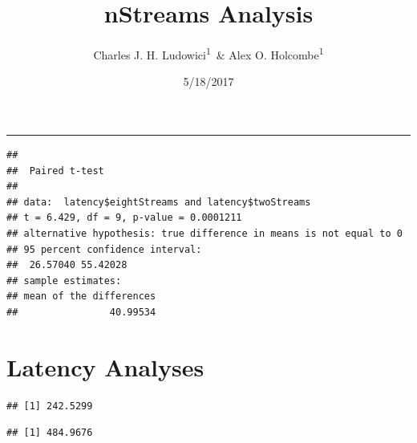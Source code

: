 \documentclass[,man]{apa6}
\title{nStreams Analysis}
\author{Charles J. H. Ludowici\textsuperscript{1}~\& Alex O.
Holcombe\textsuperscript{1}}
\date{5/18/2017}
\affiliation{
\vspace{0.5cm}
\textsuperscript{1} The University of Sydney}
\begin{document}
\maketitle

\begin{center}\rule{0.5\linewidth}{\linethickness}\end{center}

\begin{verbatim}
## 
##  Paired t-test
## 
## data:  latency$eightStreams and latency$twoStreams
## t = 6.429, df = 9, p-value = 0.0001211
## alternative hypothesis: true difference in means is not equal to 0
## 95 percent confidence interval:
##  26.57040 55.42028
## sample estimates:
## mean of the differences 
##                40.99534
\end{verbatim}

\section{Latency Analyses}\label{latency-analyses}

\begin{verbatim}
## [1] 242.5299
\end{verbatim}

\begin{verbatim}
## [1] 484.9676
\end{verbatim}
\end{document}

